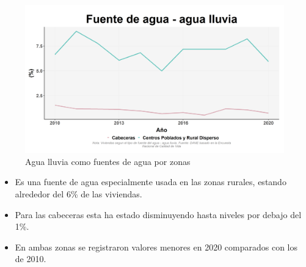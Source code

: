     \begin{figure}[H]
        \caption{Agua lluvia como fuentes de agua por zonas \label{map_result_2} }
        \begin{center}
        \includegraphics[width=\textwidth,keepaspectratio]{img/var_140_trend.png}
        \end{center}
    \end{figure}
            \begin{itemize}
                    \item Es una fuente de agua especialmente usada en las zonas rurales, estando alrededor del 6\% de las viviendas.
                    \item Para las cabeceras esta ha estado disminuyendo hasta niveles por debajo del 1\%.
                    \item En ambas zonas se registraron valores menores en 2020 comparados con los de 2010.
                    \end{itemize}

